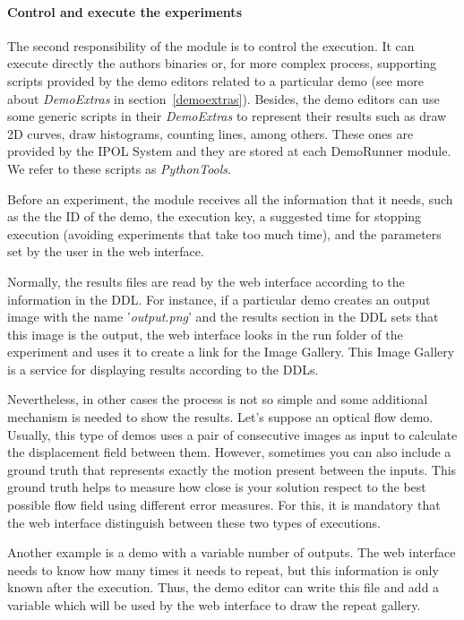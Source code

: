 \paragraph{Control and execute the experiments}
\noindent

The second responsibility of the module is to control the execution.  It can execute directly the authors binaries or, for more complex process, supporting scripts provided by the demo editors related to a particular demo (see more about \textit{DemoExtras} in section~\ref{demoextras}). Besides, the demo editors can use some generic scripts in their \textit{DemoExtras} to represent their results such as draw 2D curves, draw histograms, counting lines, among others. These ones are provided by the IPOL System and they are stored at each DemoRunner module. We refer to these scripts as \textit{PythonTools}.

Before an experiment, the module receives all the information that it needs, such as the the ID of the demo, the execution key, a suggested time for stopping execution (avoiding experiments that take too much time), and the parameters set by the user in the web interface.

Normally, the results files are read by the web interface according to the information in the DDL. For instance, if a particular demo creates an output image with the name '\textit{output.png}' and the results section in the DDL sets that this image is the output, the web interface looks in the run folder of the experiment and uses it to create a link for the Image Gallery. This Image Gallery is a service for displaying results according to the DDLs.

Nevertheless, in other cases the process is not so simple and some additional mechanism is needed to show the results.  Let's suppose an optical flow demo. Usually, this type of demos uses a pair of consecutive images as input to calculate the displacement field between them. However, sometimes you can also include a ground truth that represents exactly the motion present between the inputs. This ground truth helps to measure how close is your solution respect to the best possible flow field using different error measures. For this, it is mandatory that the web interface distinguish between these two types of executions. 

Another example is a demo with a variable number of outputs. The web interface needs to know how many times it needs to repeat, but this information is only known after the execution. Thus, the demo editor can write this file and add a variable which will be used by the web interface to draw the repeat gallery.

